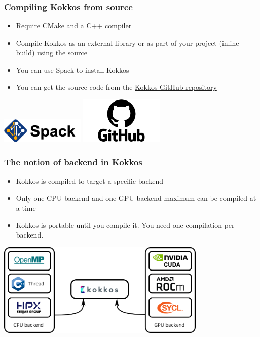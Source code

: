 \documentclass[aspectratio=169]{beamer}
\begin{document}
\begin{frame}
    \frametitle{Compiling Kokkos from source} 
    \begin{itemize}
        \item Require CMake and a C++ compiler
        \item Compile Kokkos as an external library or as part of your project (inline build) using the source
        \item You can use Spack to install Kokkos
        \item You can get the source code from the \href{https://github.com/kokkos/kokkos}{Kokkos GitHub repository}
    \end{itemize}

    \hspace{1cm}

    \centering
    \includegraphics[width=0.3\textwidth]{../../images/spack.png}
    \includegraphics[width=0.3\textwidth]{../../images/GitHub-logo.png}

\end{frame}


\begin{frame}
    \frametitle{The notion of backend in Kokkos} 
    \begin{itemize}
        \item Kokkos is compiled to target a specific backend
        \item Only one CPU backend and one GPU backend maximum can be compiled at a time
        \item Kokkos is portable until you compile it. You need one compilation per backend.
    \end{itemize}

    \hspace{1cm}

    \centering
    \includegraphics[width=0.75\textwidth]{../../images/kokkos_backend.png}

\end{frame}
\end{document}

